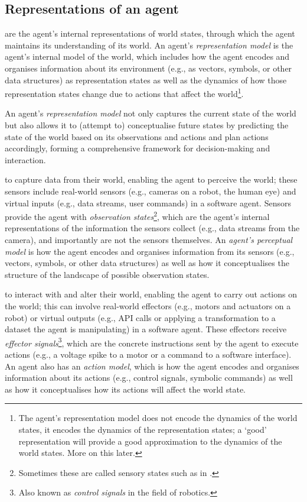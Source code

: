 \subsection{Representations of an agent}

 are the agent's internal representations of world states, through which the agent maintains its understanding of its world.
An agent's \emph{representation model} is the agent's internal model of the world, which includes how the agent encodes and organises information about its environment (e.g., as vectors, symbols, or other data structures) as representation states as well as the dynamics of how those representation states change due to actions that affect the world\footnote{The agent's representation model does not encode the dynamics of the world states, it encodes the dynamics of the representation states; a `good' representation will provide a good approximation to the dynamics of the world states. More on this later.}.

An agent's \emph{representation model} not only captures the current state of the world but also allows it to (attempt to) conceptualise future states by predicting the state of the world based on its observations and actions and plan actions accordingly, forming a comprehensive framework for decision-making and interaction.

 to capture data from their world, enabling the agent to perceive the world; these sensors include real-world sensors (e.g., cameras on a robot, the human eye) and virtual inputs (e.g., data streams, user commands) in a software agent.
Sensors provide the agent with \emph{observation states}\footnote{Sometimes these are called sensory states such as in \cite{Ramstead2020}.}, which are the agent's internal representations of the information the sensors collect (e.g., data streams from the camera), and importantly are not the sensors themselves.
An \emph{agent's perceptual model} is how the agent encodes and organises information from its sensors (e.g., vectors, symbols, or other data structures) as well as how it conceptualises the structure of the landscape of possible observation states.

 to interact with and alter their world, enabling the agent to carry out actions on the world; this can involve real-world effectors (e.g., motors and actuators on a robot) or virtual outputs (e.g., API calls or applying a transformation to a dataset the agent is manipulating) in a software agent.
These effectors receive \emph{effector signals}\footnote{Also known as \emph{control signals} in the field of robotics.}, which are the concrete instructions sent by the agent to execute actions (e.g., a voltage spike to a motor or a command to a software interface).
An agent also has an \emph{action model}, which is how the agent encodes and organises information about its actions (e.g., control signals, symbolic commands) as well as how it conceptualises how its actions will affect the world state.

